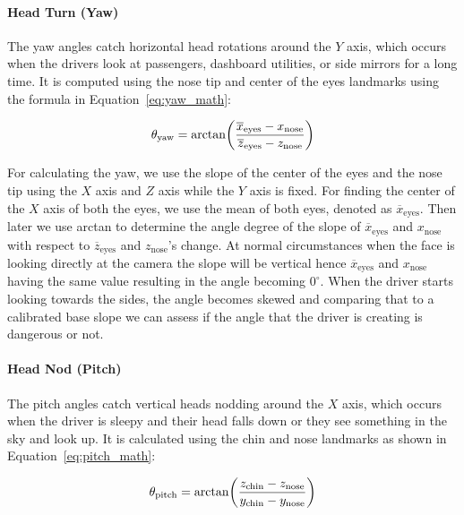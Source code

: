 \documentclass[pdflatex,sn-mathphys-num]{sn-jnl}
\theoremstyle{thmstyleone}%
\theoremstyle{thmstyletwo}%
\theoremstyle{thmstylethree}%
\begin{document}
	\paragraph{Head Turn (Yaw)}
	The yaw angles catch horizontal head rotations around the $Y$ axis, which occurs when the drivers look at passengers, dashboard utilities, or side mirrors for a long time. It is computed using the nose tip and center of the eyes landmarks using the formula in Equation~\ref{eq:yaw_math}:
	
	\begin{equation}
		\label{eq:yaw_math}
		\begin{gathered}
			\theta_{\mathrm{yaw}} = \arctan\!\left( \frac{\overline{x}_{\mathrm{eyes}} - x_{\mathrm{nose}}}{\overline{z}_{\mathrm{eyes}} - z_{\mathrm{nose}}} \right) 
		\end{gathered}
		\\[0.5em]
	\end{equation}
	
	For calculating the yaw, we use the slope of the center of the eyes and the nose tip using the $X$ axis and $Z$ axis while the $Y$ axis is fixed. For finding the center of the $X$ axis of both the eyes, we use the mean of both eyes, denoted as $\overline{x}_{\mathrm{eyes}}$. Then later we use arctan to determine the angle degree of the slope of $\overline{x}_{\mathrm{eyes}}$ and $x_{\mathrm{nose}}$ with respect to $\overline{z}_{\mathrm{eyes}}$ and $z_{\mathrm{nose}}$'s change. At normal circumstances when the face is looking directly at the camera the slope will be vertical hence $\overline{x}_{\mathrm{eyes}}$ and $x_{\mathrm{nose}}$ having the same value resulting in the angle becoming $0^\circ$. When the driver starts looking towards the sides, the angle becomes skewed and comparing that to a calibrated base slope we can assess if the angle that the driver is creating is dangerous or not.
	
	\paragraph{Head Nod (Pitch)}
	The pitch angles catch vertical heads nodding around the $X$ axis, which occurs when the driver is sleepy and their head falls down or they see something in the sky and look up. It is calculated using the chin and nose landmarks as shown in Equation~\ref{eq:pitch_math}:
	
	\begin{equation}
		\label{eq:pitch_math}
		\begin{gathered}
			\theta_{\mathrm{pitch}} = \arctan\!\left( \frac{z_{\mathrm{chin}} - z_{\mathrm{nose}}}{y_{\mathrm{chin}} - y_{\mathrm{nose}}} \right) \\[0.5em]
		\end{gathered}
		\\[0.5em]
	\end{equation}
	
\end{document}
